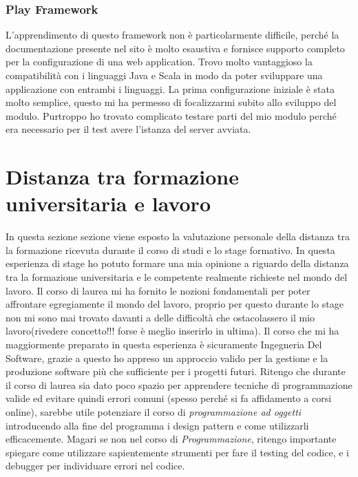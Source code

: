 \subsubsection{Play Framework}
L'apprendimento di questo framework non è particolarmente difficile, perché la documentazione presente nel sito è molto esaustiva e fornisce supporto completo per la configurazione di una web application. Trovo molto vantaggioso la compatibilità con i linguaggi Java e Scala in modo da poter sviluppare una applicazione con entrambi i linguaggi. La prima configurazione iniziale è stata molto semplice, questo mi ha permesso di focalizzarmi subito allo sviluppo del modulo. Purtroppo ho trovato complicato testare parti del mio modulo perché era necessario per il test avere l'istanza del server avviata.




\section{Distanza tra formazione universitaria e lavoro}
In questa sezione sezione viene esposto la valutazione personale della distanza tra la formazione ricevuta durante il corso di studi e lo stage formativo.
In questa esperienza di stage ho potuto formare una mia opinione a riguardo della distanza tra la formazione universitaria e le competente realmente richieste nel mondo del lavoro. Il corso di laurea mi ha fornito le nozioni fondamentali per poter affrontare egregiamente il mondo del lavoro, proprio per questo durante lo stage non mi sono mai trovato davanti a delle difficoltà che ostacolassero il mio lavoro(rivedere concetto!!! forse è meglio inserirlo in ultima). Il corso che mi ha maggiormente preparato in questa esperienza è sicuramente Ingegneria Del Software, grazie a questo ho appreso un approccio valido per la gestione e la produzione software più che sufficiente per i progetti futuri. Ritengo che durante il corso di laurea sia dato poco spazio per apprendere tecniche di programmazione valide ed evitare quindi errori comuni (spesso perché si fa affidamento a corsi online), sarebbe utile potenziare il corso di \emph{programmazione ad oggetti} introducendo alla fine del programma i design pattern e come utilizzarli efficacemente. Magari se non nel corso di \emph{Programmazione}, ritengo importante spiegare come utilizzare sapientemente strumenti per fare il testing del codice, e i debugger per individuare errori nel codice.
